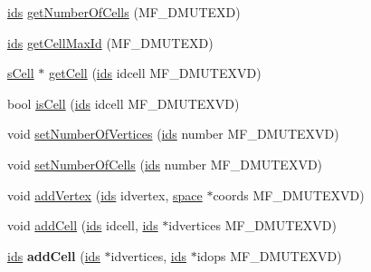 \begin{DoxyCompactItemize}
\item 
\hyperlink{classmf_1_1mfMesh3D_aeae559d0564bf64617c8fd83ba264895}{ids} \hyperlink{classmf_1_1mfMesh3D_a7a5fb0879d87329788fee8ffdfd64932}{getNumberOfCells} (MF\_\-DMUTEXD)
\item 
\hyperlink{classmf_1_1mfMesh3D_aeae559d0564bf64617c8fd83ba264895}{ids} \hyperlink{classmf_1_1mfMesh3D_a73c24174352c1b169b9b82a8dd51a01c}{getCellMaxId} (MF\_\-DMUTEXD)
\item 
\hyperlink{classmf_1_1mfMesh3D_acbb717ca80998e53d622ab2ae35b9134}{sCell} $\ast$ \hyperlink{classmf_1_1mfMesh3D_aaad815afdc1d7e0e49cd4e904db6cc93}{getCell} (\hyperlink{classmf_1_1mfMesh3D_aeae559d0564bf64617c8fd83ba264895}{ids} idcell MF\_\-DMUTEXVD)
\item 
bool \hyperlink{classmf_1_1mfMesh3D_a578c15c12e4d351e61b4d88b6d844049}{isCell} (\hyperlink{classmf_1_1mfMesh3D_aeae559d0564bf64617c8fd83ba264895}{ids} idcell MF\_\-DMUTEXVD)
\item 
void \hyperlink{classmf_1_1mfMesh3D_a5db400ff5cacf7832427b58f2b5c10a5}{setNumberOfVertices} (\hyperlink{classmf_1_1mfMesh3D_aeae559d0564bf64617c8fd83ba264895}{ids} number MF\_\-DMUTEXVD)
\item 
void \hyperlink{classmf_1_1mfMesh3D_a4d70787f5afc60ec09d0ede007cc92c4}{setNumberOfCells} (\hyperlink{classmf_1_1mfMesh3D_aeae559d0564bf64617c8fd83ba264895}{ids} number MF\_\-DMUTEXVD)
\item 
void \hyperlink{classmf_1_1mfMesh3D_a5db5e246c9c63b3988e1606f03bf8715}{addVertex} (\hyperlink{classmf_1_1mfMesh3D_aeae559d0564bf64617c8fd83ba264895}{ids} idvertex, \hyperlink{classmf_1_1mfMesh3D_aea7155b49fb50982a399056973e6b4d8}{space} $\ast$coords MF\_\-DMUTEXVD)
\item 
void \hyperlink{classmf_1_1mfMesh3D_a399b9e8291ea7bc29fa09faaed72db61}{addCell} (\hyperlink{classmf_1_1mfMesh3D_aeae559d0564bf64617c8fd83ba264895}{ids} idcell, \hyperlink{classmf_1_1mfMesh3D_aeae559d0564bf64617c8fd83ba264895}{ids} $\ast$idvertices MF\_\-DMUTEXVD)
\item 
\hypertarget{classmf_1_1mfMesh3D_a7e80d96081ccab4af16ddf3c3a76071e}{
\hyperlink{classmf_1_1mfMesh3D_aeae559d0564bf64617c8fd83ba264895}{ids} {\bfseries addCell} (\hyperlink{classmf_1_1mfMesh3D_aeae559d0564bf64617c8fd83ba264895}{ids} $\ast$idvertices, \hyperlink{classmf_1_1mfMesh3D_aeae559d0564bf64617c8fd83ba264895}{ids} $\ast$idops MF\_\-DMUTEXVD)}
\label{classmf_1_1mfMesh3D_a7e80d96081ccab4af16ddf3c3a76071e}


\end{DoxyCompactItemize}

